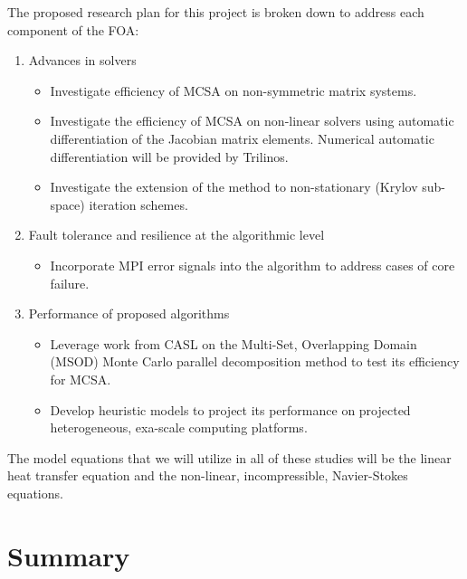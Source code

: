 \documentclass[10pt,letterpaper,english]{article}
\begin{document}
The proposed research plan for this project is broken down to address each
component of the FOA:
\begin{enumerate}
\item Advances in solvers
  \begin{itemize}
  \item Investigate efficiency of MCSA on non-symmetric matrix systems.
  \item Investigate the efficiency of MCSA on non-linear solvers using
    automatic differentiation of the Jacobian matrix elements.  Numerical
    automatic differentiation will be provided by Trilinos.
  \item Investigate the extension of the method to non-stationary (Krylov
    sub-space) iteration schemes.
  \end{itemize}
\item Fault tolerance and resilience at the algorithmic level
  \begin{itemize}
  \item Incorporate MPI error signals into the algorithm to address cases of
    core failure.
  \end{itemize}
\item Performance of proposed algorithms
  \begin{itemize}
  \item Leverage work from CASL on the Multi-Set, Overlapping Domain (MSOD)
    Monte Carlo parallel decomposition method to test its efficiency for MCSA.
  \item Develop heuristic models to project its performance on projected
    heterogeneous, exa-scale computing platforms.
  \end{itemize}
\end{enumerate}
The model equations that we will utilize in all of these studies will be the
linear heat transfer equation and the non-linear, incompressible,
Navier-Stokes equations.


\section*{Summary}
\end{document}
